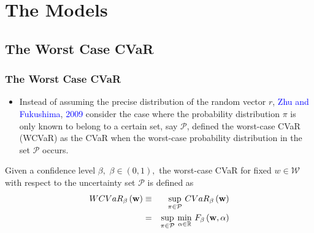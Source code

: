 \documentclass[pdf,10pt,xcolor=dvipsnames,hide notes]{beamer}
\begin{document}
\section{The Models}
\subsection{The Worst Case CVaR}

\begin{frame}[label=frame2d]
	\frametitle{The Worst Case CVaR}
	
	\begin{itemize}
		\justifying

\item Instead of assuming the precise distribution of the random vector $r$,
\textcolor{blue}{Zhu and Fukushima}, \textcolor{blue}{2009} consider the case where the probability distribution $\pi$
is only known to belong to a certain set, say $\mathcal{P}$, defined the
worst-case CVaR (WCVaR) as the CVaR when the worst-case probability
distribution in the set $\mathcal{P}$ occurs.

\end{itemize}

\begin{definition}
	Given a confidence level $\beta ,$ $\beta \in (0,1),$ the worst-case CVaR
	for fixed $w\in \mathcal{W}$ with respect to the uncertainty set $\mathcal{P}
	$ is defined as
	\begin{eqnarray}
	WCVaR_{\beta }\left( \mathbf{w}\right) &\equiv &\underset{\pi \in \mathcal{P}%
	}{\sup }~ CVaR_{\beta }\left( \mathbf{w}\right)  \notag \\
	&=&\underset{\pi \in \mathcal{P}}{\sup }~\underset{\alpha \in
		\mathbb{R}
	}{\min }~F_{\beta }\left(\mathbf{w},\alpha \right)  \label{14}
	\end{eqnarray}
\end{definition}

\end{frame}
\end{document}
